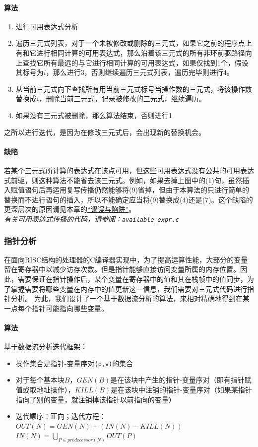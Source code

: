 \paragraph*{算法}
\begin{enumerate}
	\item 进行可用表达式分析
	\item 遍历三元式列表，对于一个未被修改或删除的三元式，如果它之前的程序点上有和它进行相同计算的可用表达式，那么沿着该三元式的所有非环前驱路径向上查找它所有最远的与它进行相同计算的可用表达式，如果仅找到1个，假设其标号为$i$，那么进行3，否则继续遍历三元式列表，遍历完毕则进行4。
	\item 从当前三元式向下查找所有用当前三元式标号当操作数的三元式，将该操作数替换成$i$，删除当前三元式，记录被修改的三元式，继续遍历。
	\item 如果没有三元式被删除，那么算法结束，否则进行1
\end{enumerate}
之所以进行迭代，是因为在修改三元式后，会出现新的替换机会。
\paragraph*{缺陷}
若某个三元式所计算的表达式在该点可用，但这些可用表达式没有公共的可用表达式前驱，则这种算法不能省去该三元式。例如，如果去掉上图中的(1)句，虽然插入赋值语句后再运用复写传播仍然能够将(9)省掉，但由于本算法的只进行简单的替换而不进行语句的插入，所以不能确定应当将(9)替换成(4)还是(7)。这个缺陷的更深层次的原因请见本章的\hyperref[pitfallc2]{“谬误与陷阱”}。\\

{\it \anchor 有关可用表达式传播的代码，请参阅：\verb|available_expr.c|}\\
\subsubsection{指针分析}
在面向RISC结构的处理器的C编译器实现中，为了提高运算性能，大部分的变量留在寄存器中以减少访存次数。但是指针能够直接访问变量所属的内存位置。因此，需要保证在指针操作后，某个变量在寄存器中的值和其在栈帧中的值同步，为了掌握需要将哪些变量在内存中的值更新这一信息，我们需要对三元式代码进行指针分析。
为此，我们设计了一个基于数据流分析的算法，来相对精确地得到在某一点每个指针可能指向哪些变量。
\paragraph*{算法}基于数据流分析迭代框架：
\begin{itemize}
\item 操作集合是指针-变量序对\verb|(p,v)|的集合
\item 对于每个基本块$B$，$GEN(B)$是在该块中产生的指针-变量序对（即有指针赋值或取地址操作），$KILL(B)$是在该块中注销的指针-变量序对（如果某指针指向了别的变量，就注销掉该指针以前指向的变量）
\item 迭代顺序：正向；迭代方程：$OUT(N) = GEN(N)+(IN(N)-KILL(N))$\\$IN(N)=\bigcup_{P\in predecessor(N)}OUT(P)$
\end{itemize}
